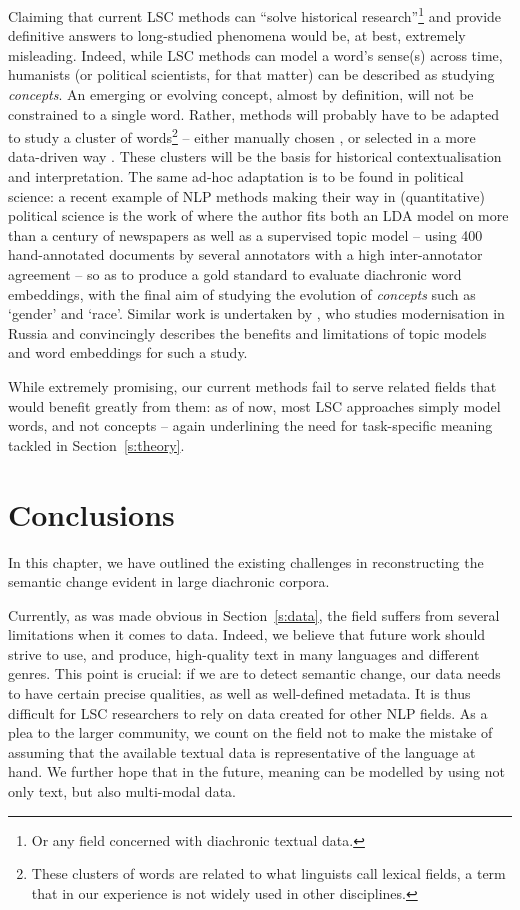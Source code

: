 \documentclass[output=paper]{langscibook}
\begin{document}
Claiming that current LSC methods can ``solve historical research''\footnote{Or any field concerned with diachronic textual data.} and provide definitive answers to long-studied phenomena would be, at best, extremely misleading.
Indeed, while LSC methods can model a word's sense(s) across time, humanists (or political scientists, for that matter) can be described as studying \emph{concepts}. 
An emerging or evolving concept, almost by definition, will not be constrained to a single word. 
Rather, methods will probably have to be adapted to study a cluster of words\footnote{These clusters of words are related to what linguists call lexical fields, a term that in our experience is not widely used in other disciplines.} -- either manually chosen \citep{kenter2015ad,recchia2016tracing}, or selected in a more data-driven way \citep{tahmasebi2013models,hengchen2020vocab}. These clusters will be the basis for historical contextualisation and interpretation. 
The same ad-hoc adaptation is to be found in political science: a recent example of NLP methods making their way in (quantitative) political science is the work of \citet{rodman2020timely} where the author fits both an LDA model on more than a century of newspapers as well as a supervised topic model -- using 400 hand-annotated documents by several annotators with a high inter-annotator agreement -- so as to produce a gold standard to evaluate diachronic word embeddings, with the final aim of studying the evolution of \textit{concepts} such as `gender' and `race'. 
Similar work is undertaken by \citet{indukaev_studying_2021}, who studies modernisation in Russia and convincingly describes the benefits and limitations of topic models and word embeddings for such a study.\largerpage

While extremely promising, our current methods fail to serve related fields that would benefit greatly from them: as of now, most LSC approaches simply model words, and not concepts -- again underlining the need for task-specific meaning tackled in Section~\ref{s:theory}.

\section{Conclusions}
\label{s:conclusions}

In this chapter, we have outlined the existing challenges in reconstructing the semantic change evident in large diachronic corpora.

Currently, as was made obvious in Section~\ref{s:data}, the field suffers from several limitations when it comes to data. Indeed, we believe that future work should strive to use, and produce, high-quality text in many languages and different genres. 
This point is crucial: if we are to detect semantic change, our data needs to have certain precise qualities, as well as well-defined metadata. It is thus difficult for LSC researchers to rely on data created for other NLP fields.
As a plea to the larger community, we count on the field not to make the mistake of assuming that the available textual data is representative of the language at hand. 
We further hope that in the future, meaning can be modelled by using not only text, but also multi-modal data. 
\end{document}
